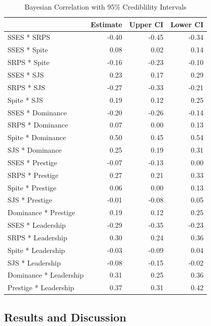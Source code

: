 \documentclass[
  donotrepeattitle,doc, 12pt, a4paper,floatsintext]{apa7}
\begin{document}
\begin{table}[tbp]

\begin{center}
\begin{threeparttable}

\caption{\label{tab:unnamed-chunk-6}Bayesian Correlation with 95\% Crediblility Intervals}

\begin{tabular}{lrrr}
\toprule
 & Estimate & Upper CI & Lower CI\\
\midrule
SSES * SRPS & -0.40 & -0.45 & -0.34\\
SSES * Spite & 0.08 & 0.02 & 0.14\\
SRPS * Spite & -0.16 & -0.23 & -0.10\\
SSES * SJS & 0.23 & 0.17 & 0.29\\
SRPS * SJS & -0.27 & -0.33 & -0.21\\
Spite * SJS & 0.19 & 0.12 & 0.25\\
SSES * Dominance & -0.20 & -0.26 & -0.14\\
SRPS * Dominance & 0.07 & 0.00 & 0.13\\
Spite * Dominance & 0.50 & 0.45 & 0.54\\
SJS * Dominance & 0.25 & 0.19 & 0.31\\
SSES * Prestige & -0.07 & -0.13 & 0.00\\
SRPS * Prestige & 0.27 & 0.21 & 0.33\\
Spite * Prestige & 0.06 & 0.00 & 0.13\\
SJS * Prestige & -0.01 & -0.08 & 0.05\\
Dominance * Prestige & 0.19 & 0.12 & 0.25\\
SSES * Leadership & -0.29 & -0.35 & -0.23\\
SRPS * Leadership & 0.30 & 0.24 & 0.36\\
Spite * Leadership & -0.03 & -0.09 & 0.04\\
SJS * Leadership & -0.08 & -0.15 & -0.02\\
Dominance * Leadership & 0.31 & 0.25 & 0.36\\
Prestige * Leadership & 0.37 & 0.31 & 0.42\\
\bottomrule
\end{tabular}

\end{threeparttable}
\end{center}

\end{table}

\hypertarget{results-and-discussion}{%
\subsection{Results and Discussion}\label{results-and-discussion}}
\end{document}
